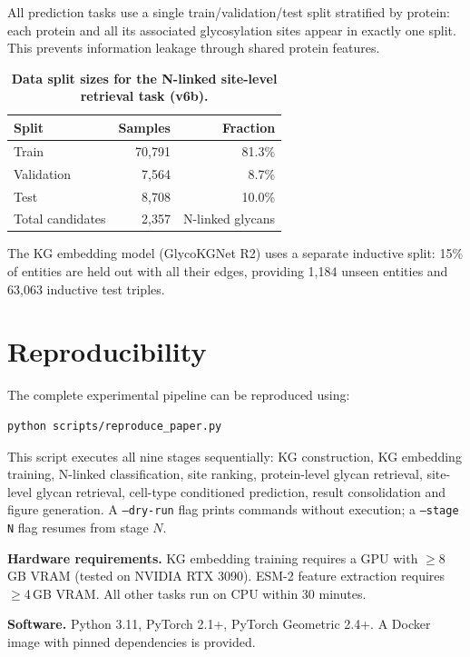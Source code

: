\documentclass[11pt,a4paper]{article}
\begin{document}
All prediction tasks use a single train/validation/test split stratified by
protein: each protein and all its associated glycosylation sites appear in
exactly one split. This prevents information leakage through shared protein
features.

\begin{table}[H]
\centering
\caption{\textbf{Data split sizes for the N-linked site-level retrieval task
(v6b).}}
\label{tab:splits}
\small
\begin{tabular}{lrr}
\toprule
\textbf{Split} & \textbf{Samples} & \textbf{Fraction} \\
\midrule
Train      & 70,791 & 81.3\% \\
Validation &  7,564 &  8.7\% \\
Test       &  8,708 & 10.0\% \\
\midrule
Total candidates & 2,357 & N-linked glycans \\
\bottomrule
\end{tabular}
\end{table}

The KG embedding model (GlycoKGNet R2) uses a separate inductive split: 15\%
of entities are held out with all their edges, providing 1,184 unseen entities
and 63,063 inductive test triples.

\section{Reproducibility}
\label{sec:reproducibility}

The complete experimental pipeline can be reproduced using:
\begin{verbatim}
python scripts/reproduce_paper.py
\end{verbatim}

This script executes all nine stages sequentially: KG construction, KG
embedding training, N-linked classification, site ranking, protein-level
glycan retrieval, site-level glycan retrieval, cell-type conditioned
prediction, result consolidation and figure generation. A \texttt{--dry-run}
flag prints commands without execution; a \texttt{--stage N} flag resumes
from stage $N$.

\textbf{Hardware requirements.} KG embedding training requires a GPU with
$\geq$8\,GB VRAM (tested on NVIDIA RTX 3090). ESM-2 feature extraction
requires $\geq$4\,GB VRAM. All other tasks run on CPU within 30 minutes.

\textbf{Software.} Python 3.11, PyTorch 2.1+, PyTorch Geometric 2.4+.
A Docker image with pinned dependencies is provided.
\end{document}
